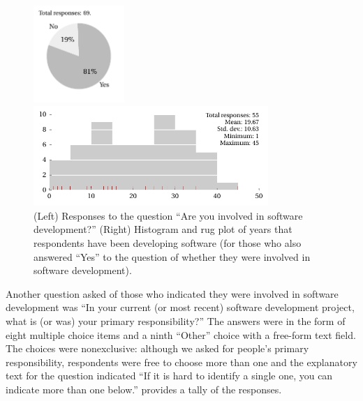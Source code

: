\documentclass{casicswhitepaper}
\begin{document}

\begin{figure}[thb]
  \hspace*{0.5in}
  \begin{minipage}[b]{0.3\linewidth}
    \includegraphics[width=1.35in]{files/plots/number-of-developers.pdf}
  \end{minipage}%
  \begin{minipage}[b]{0.75\linewidth}
    \includegraphics[width=3.5in]{files/plots/histogram-years.pdf}
  \end{minipage}%
  \vspace*{-2ex}
  \caption{(Left) Responses to the question  ``Are you involved in software development?'' (Right) Histogram and rug plot of years that respondents have been developing software (for those who also answered ``Yes'' to the question of whether they were involved in software development).}
  \label{years}
\end{figure}

Another question asked of those who indicated they were involved in software development was ``In your current (or most recent) software development project, what is (or was) your primary responsibility?'' The answers were in the form of eight multiple choice items and a ninth ``Other'' choice with a free-form text field.  The choices were nonexclusive: although we asked for people's primary responsibility, respondents were free to choose more than one and the explanatory text for the question indicated ``If it is hard to identify a single one, you can indicate more than one below.''   provides a tally of the responses.
\end{document}
